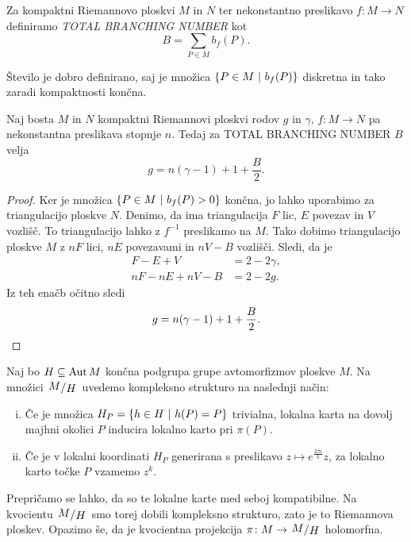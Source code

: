 \begin{definicija}
Za kompaktni Riemannovo ploskvi $M$ in $N$ ter nekonstantno
preslikavo $f \colon M \to N$ definiramo
\emph{TOTAL BRANCHING NUMBER} kot
\[
B = \sum_{P \in M} b_f(P).
\]
\end{definicija}

Število je dobro definirano, saj je množica
$\left\{P \in M~\middle\vert~b_f(P)\right\}$ diskretna in tako zaradi kompaktnosti
končna.

\begin{izrek}
\label{iz:rie-hur}
Naj bosta $M$ in $N$ kompaktni Riemannovi ploskvi rodov $g$ in
$\gamma$, $f \colon M \to N$ pa nekonstantna preslikava stopnje
$n$. Tedaj za TOTAL BRANCHING NUMBER $B$ velja
\[
g = n(\gamma - 1) + 1 + \frac{B}{2}.
\]
\end{izrek}

\begin{proof}
Ker je množica $\left\{P \in M~\middle\vert~b_f(P) > 0\right\}$ končna, jo lahko
uporabimo za triangulacijo ploskve $N$. Denimo, da ima
triangulacija $F$ lic, $E$ povezav in $V$ vozlišč. To
triangulacijo lahko z $f^{-1}$ preslikamo na $M$. Tako dobimo
triangulacijo ploskve $M$ z $nF$ lici, $nE$ povezavami in $nV - B$
vozlišči. Sledi, da je
\begin{align*}
F - E + V &= 2 - 2 \gamma,
\\
nF - nE + nV - B &= 2 - 2g.
\end{align*}
Iz teh enačb očitno sledi
\[
g = n(\gamma - 1) + 1 + \frac{B}{2}. \qedhere
\]
\end{proof}

\begin{definicija}
Naj bo $H \subseteq \operatorname{Aut} M$ končna podgrupa grupe avtomorfizmov
ploskve $M$. Na množici $\kvoc{M}{H}$ uvedemo kompleksno strukturo
na naslednji način:

\begin{enumerate}[i)]
\item Če je množica $H_P = \left\{h \in H~\middle\vert~h(P) = P\right\}$ trivialna,
lokalna karta na dovolj majhni okolici $P$ inducira lokalno karto
pri $\pi(P)$.
\item Če je v lokalni koordinati $H_P$ generirana s preslikavo
$z \mapsto e^{\frac{2 \pi i}{k}} z$, za lokalno karto točke $P$
vzamemo $z^k$.
\end{enumerate}
\end{definicija}


Prepričamo se lahko, da so te lokalne karte med seboj kompatibilne.
Na kvocientu $\kvoc{M}{H}$ smo torej dobili kompleksno strukturo,
zato je to Riemannova ploskev. Opazimo še, da je kvocientna
projekcija $\pi \colon M \to \kvoc{M}{H}$ holomorfna.

